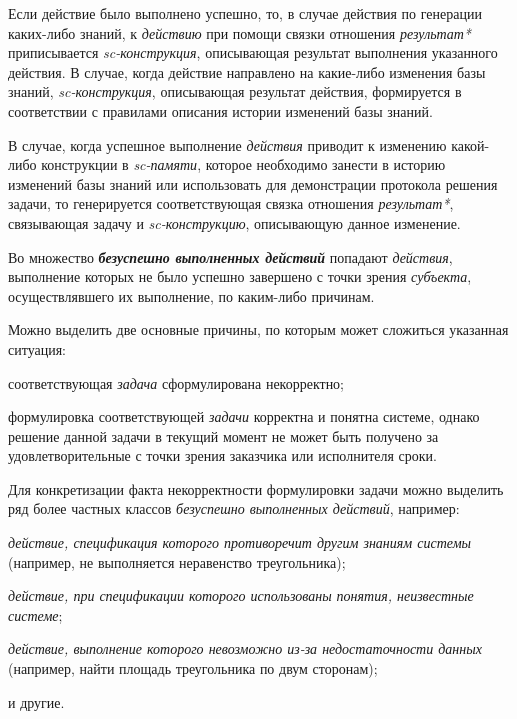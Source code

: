 Если действие было выполнено успешно, то, в случае действия по генерации каких-либо знаний, к \textit{действию} при помощи связки отношения \textit{результат*} приписывается \textit{sc-конструкция}, описывающая результат выполнения указанного действия. В случае, когда действие направлено на какие-либо изменения базы знаний, \textit{sc-конструкция}, описывающая результат действия, формируется в соответствии с правилами описания истории изменений базы знаний.

В случае, когда успешное выполнение \textit{действия} приводит к изменению какой-либо конструкции в \textit{sc-памяти}, которое необходимо занести в историю изменений базы знаний или использовать для демонстрации протокола решения задачи, то генерируется соответствующая связка отношения \textit{результат*}, связывающая задачу и \textit{sc-конструкцию}, описывающую данное изменение.

Во множество \textbf{\textit{безуспешно выполненных действий}} попадают \textit{действия}, выполнение которых не было успешно завершено с точки зрения \textit{субъекта}, осуществлявшего их выполнение, по каким-либо причинам.

Можно выделить две основные причины, по которым может сложиться указанная ситуация:
\begin{textitemize}
	\item соответствующая \textit{задача} сформулирована некорректно;
	\item формулировка соответствующей \textit{задачи} корректна и понятна системе, однако решение данной задачи в текущий момент не может быть получено за удовлетворительные с точки зрения заказчика или исполнителя сроки.
\end{textitemize}

Для конкретизации факта некорректности формулировки задачи можно выделить ряд более частных классов \textit{безуспешно выполненных действий}, например:
\begin{textitemize}
	\item \textit{действие, спецификация которого противоречит другим знаниям системы} (например, не выполняется неравенство треугольника);
	\item \textit{действие, при спецификации которого использованы понятия, неизвестные системе};
	\item \textit{действие, выполнение которого невозможно из-за недостаточности данных} (например, найти площадь треугольника по двум сторонам);
	\item и другие.
\end{textitemize}

